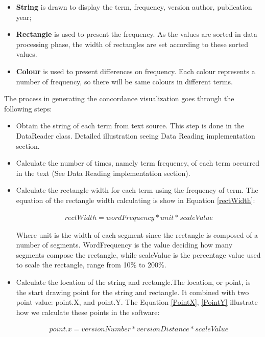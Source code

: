 \begin{itemize}
	\item \textbf{String} is drawn to display the term, frequency, version author, publication year; 
	\item \textbf{Rectangle} is used to present the frequency. As the values are sorted in data processing phase, the width of rectangles are set according to these sorted values.
	\item \textbf{Colour} is used to present differences on frequency. Each colour represents a number of frequency, so there will be same colours in different terms.
\end{itemize}

The process in generating the concordance visualization goes through the following steps:
\begin{itemize}
	\item \textbf{} Obtain the string of each term from text source. This step is done in the DataReader class. Detailed illustration seeing Data Reading implementation section.
	\item \textbf{} Calculate the number of times, namely term frequency, of each term occurred in the text (See Data Reading implementation section).  	
	\item \textbf{} Calculate the rectangle width for each term using the frequency of term. The equation of the rectangle width calculating is show in Equation \eqref{rectWidth}:
	
	\begin{multline}\label{rectWidth}
	rectWidth=wordFrequency*unit*scaleValue
	\end{multline}
	
	Where unit is the width of each segment since the rectangle is composed of a number of segments. WordFrequency is the value deciding how many segments compose the rectangle, while scaleValue is the percentage value used to scale the rectangle, range from 10\% to 200\%.
	
	\item \textbf{}Calculate the location of the string and rectangle.The location, or point, is the start drawing point for the string and rectangle. It combined with two point value: point.X, and point.Y. The Equation \eqref{PointX}, \eqref{PointY} illustrate how we calculate these points in the software:
	
	\begin{multline}\label{PointX}
	point.x=versionNumber*versionDistance*scaleValue
	\end{multline}
	

\end{itemize}
